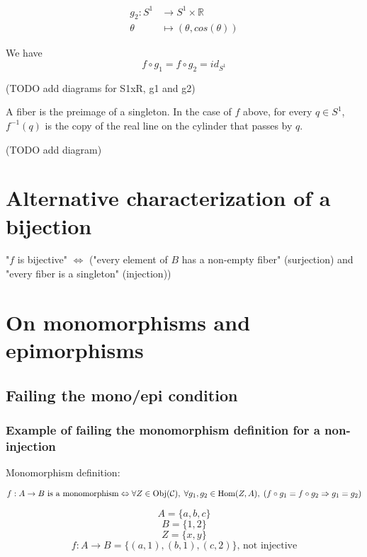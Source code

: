 $$
\begin{aligned}
g_2 : S^1    & \longrightarrow  S^1 \times \mathbb{R} \\
      \theta & \longmapsto      (\theta, cos(\theta))
\end{aligned}
$$

We have
$$f \circ g_1 = f \circ g_2 = id_{S^1}$$

(TODO add diagrams for S1xR, g1 and g2)

A fiber is the preimage of a singleton. In the case of $f$ above, for every $q \in S^1$, $f^{-1}({q})$ is the copy of the real line on the cylinder that passes by $q$.

(TODO add diagram)






\section*{Alternative characterization of a bijection}
"$f$ is bijective" $\Leftrightarrow$ ("every element of $B$ has a non-empty fiber" (surjection) and "every fiber is a singleton" (injection))





\section*{On monomorphisms and epimorphisms}

\subsection*{Failing the mono/epi condition}


\subsubsection*{Example of failing the monomorphism definition for a non-injection}

Monomorphism definition:

$$
\text{$f : A \to B$ is a monomorphism}
\\ \Leftrightarrow \\
\forall Z \in \text{Obj}(\mathcal{C}), \;
\forall g_1, g_2 \in \text{Hom}(Z, A), \;
(f \circ g_1 = f \circ g_2 \Rightarrow g_1 = g_2)
$$



$$A = \{ a, b, c \}$$
$$B = \{ 1, 2    \}$$
$$Z = \{ x, y    \}$$
$$f : A \to B = \{ (a, 1), (b, 1), (c, 2) \} \text{, not injective}$$

